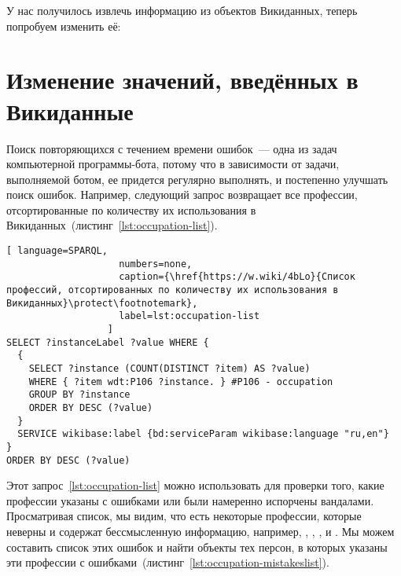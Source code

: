 
У нас получилось извлечь информацию из объектов Викиданных, теперь попробуем изменить её: 

\section{Изменение значений, введённых в Викиданные}
\label{sec:modifying the values entered in Wikidata}

Поиск повторяющихся с течением времени ошибок~--- одна из задач компьютерной программы-бота, потому что в зависимости от задачи, выполняемой ботом, ее придется регулярно выполнять, и постепенно улучшать поиск ошибок. Например, следующий запрос возвращает все профессии, отсортированные по количеству их использования в Викиданных~(листинг~\ref{lst:occupation-list}).

\begin{lstlisting}[ language=SPARQL,
                    numbers=none,
                    caption={\href{https://w.wiki/4bLo}{Cписок профессий, отсортированных по количеству их использования в Викиданных}\protect\footnotemark},
                    label=lst:occupation-list
                  ]
SELECT ?instanceLabel ?value WHERE {
  {
    SELECT ?instance (COUNT(DISTINCT ?item) AS ?value) 
    WHERE { ?item wdt:P106 ?instance. } #P106 - occupation
    GROUP BY ?instance
    ORDER BY DESC (?value)
  }
  SERVICE wikibase:label {bd:serviceParam wikibase:language "ru,en"}
}
ORDER BY DESC (?value)
\end{lstlisting} 

Этот запрос~\ref{lst:occupation-list} 
можно использовать для проверки того, какие профессии указаны с ошибками или были намеренно испорчены вандалами. 
Просматривая список, мы видим, что есть некоторые профессии, 
которые неверны и содержат бессмысленную информацию, 
например, , , ,  и . 
Мы можем составить список этих ошибок и найти объекты тех персон, 
в которых указаны эти профессии с ошибками~(листинг~\ref{lst:occupation-mistakeslist}).

